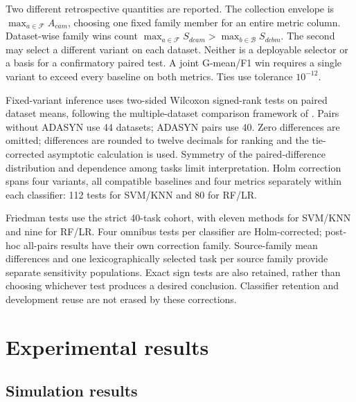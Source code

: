\documentclass[conference]{IEEEtran}
\begin{document}
Two different retrospective quantities are reported. The collection envelope is $\max_{a\in\mathcal F}A_{cam}$, choosing one fixed family member for an entire metric column. Dataset-wise family wins count $\max_{a\in\mathcal F}S_{dcam}>\max_{b\in\mathcal B}S_{dcbm}$. The second may select a different variant on each dataset. Neither is a deployable selector or a basis for a confirmatory paired test. A joint G-mean/F1 win requires a single variant to exceed every baseline on both metrics. Ties use tolerance $10^{-12}$.

Fixed-variant inference uses two-sided Wilcoxon signed-rank tests on paired dataset means, following the multiple-dataset comparison framework of \citet{demsar2006}. Pairs without ADASYN use 44 datasets; ADASYN pairs use 40. Zero differences are omitted; differences are rounded to twelve decimals for ranking and the tie-corrected asymptotic calculation is used. Symmetry of the paired-difference distribution and dependence among tasks limit interpretation. Holm correction \citep{holm1979} spans four variants, all compatible baselines and four metrics separately within each classifier: 112 tests for SVM/KNN and 80 for RF/LR.

Friedman tests use the strict 40-task cohort, with eleven methods for SVM/KNN and nine for RF/LR. Four omnibus tests per classifier are Holm-corrected; post-hoc all-pairs results have their own correction family. Source-family mean differences and one lexicographically selected task per source family provide separate sensitivity populations. Exact sign tests are also retained, rather than choosing whichever test produces a desired conclusion. Classifier retention and development reuse are not erased by these corrections.

\section{Experimental results}
\subsection{Simulation results}
\end{document}
